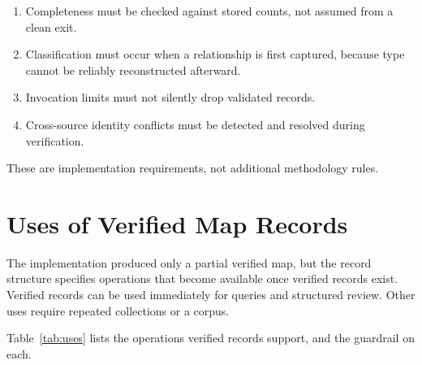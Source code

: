 \documentclass[preprints,article,submit,moreauthors]{Definitions/mdpi}
\begin{document}
\begin{enumerate}
  \item Completeness must be checked against stored counts, not assumed from a clean exit.
  \item Classification must occur when a relationship is first captured, because type cannot be reliably reconstructed afterward.
  \item Invocation limits must not silently drop validated records.
  \item Cross-source identity conflicts must be detected and resolved during verification.
\end{enumerate}

These are implementation requirements, not additional methodology rules.


\section{Uses of Verified Map Records}\label{sec:8}

The implementation produced only a partial verified map, but the record structure specifies operations that become available once verified records exist. Verified records can be used immediately for queries and structured review. Other uses require repeated collections or a corpus.

Table~\ref{tab:uses} lists the operations verified records support, and the guardrail on each.
\end{document}
